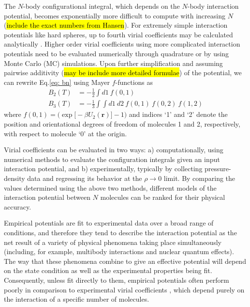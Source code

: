         The $N$-body configurational integral, which depends on the $N$-body interaction potential, becomes exponentially more difficult to compute with increasing $N$ (\hl{include the exact numbers from Hansen}). For extremely simple interaction potentials like hard spheres, up to fourth virial coefficients may be calculated analytically \cite{Masters2008}. Higher order virial coefficients using more complicated interaction potentials need to be evaluated numerically through quadrature or by using Monte Carlo (MC) simulations. Upon further simplification and assuming pairwise additivity (\hl{may be include more detailed formulae}) of the potential, we can rewrite Eq.\eqref{eq: bn} using Mayer $f$-functions as \cite{Masters2008,Hansen}
        \begin{equation} \label{eq: mayerfn}
            \begin{aligned}
                B_2(T) &= -\frac{1}{2} \displaystyle\int d1 ~ f(0,1)\\
                B_3(T) &= -\frac{1}{3} \displaystyle\int \int d1~d2~f(0,1)~f(0,2)~f(1,2)
            \end{aligned}
        \end{equation}
        where $f(0,1) = \Big( \exp \big[ -\beta U_2(\bm{r}) \big] - 1 \Big) $ and indices `1' and `2' denote the position and orientational degrees of freedom of molecules 1 and 2, respectively, with respect to molecule `0' at the origin.

        Virial coefficients can be evaluated in two ways: a) computationally, using numerical methods to evaluate the configuration integrals given an input interaction potential, and b) experimentally, typically by collecting pressure-density data and regressing its behavior at the $\rho \to 0$ limit. By comparing the values determined using the above two methods, different models of the interaction potential between $N$ molecules can be ranked for their physical accuracy. 

        Empirical potentials are fit to experimental data over a broad range of conditions, and therefore they tend to describe the interaction potential as the net result of a variety of physical phenomena taking place simultaneously (including, for example, multibody interactions and nuclear quantum effects). The way that these phenomena combine to give an effective potential will depend on the state condition as well as the experimental properties being fit. Consequently, unless fit directly to them, empirical potentials often perform poorly in comparison to experimental virial coefficients \cite{Benjamin2007}, which depend purely on the interaction of a specific number of molecules.

